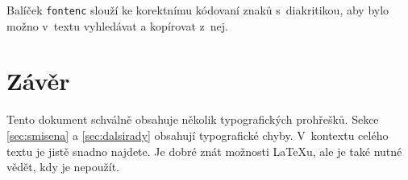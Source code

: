 \documentclass[10pt,twocolumn,a4paper]{article}
\begin{document}
Balíček \texttt{fontenc} slouží ke korektnímu kódovaní znaků s~diakritikou, aby bylo možno v~textu vyhledávat a kopírovat z~nej.

\section{Závěr}

Tento dokument schválně obsahuje několik typografických prohřešků. Sekce \ref{sec:smisena} a \ref{sec:dalsirady} obsahují typografické chyby. V~kontextu celého textu je jistě snadno najdete. Je dobré znát možnosti \LaTeX u, ale je také nutné vědět, kdy je nepoužít.
\end{document}
